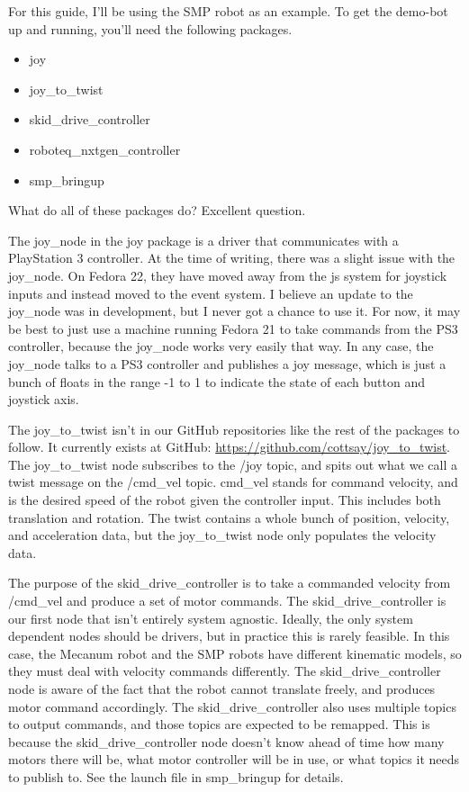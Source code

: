  For this guide, I'll be using the SMP robot as an example. To get the demo-bot up and running, you'll need the following packages.

\begin{itemize}
\item{joy}
\item{joy\_to\_twist}
\item{skid\_drive\_controller}
\item{roboteq\_nxtgen\_controller}
\item{smp\_bringup}
\end{itemize}

What do all of these packages do? Excellent question.

The joy\_node in the joy package is a driver that communicates with a PlayStation 3 controller. At the time of writing, there was a slight issue with the joy\_node. On Fedora 22, they have moved away from the js system for joystick inputs and instead moved to the event system. I believe an update to the joy\_node was in development, but I never got a chance to use it. For now, it may be best to just use a machine running Fedora 21 to take commands from the PS3 controller, because the joy\_node works very easily that way. In any case, the joy\_node talks to a PS3 controller and publishes a joy message, which is just a bunch of floats in the range -1 to 1 to indicate the state of each button and joystick axis.

The joy\_to\_twist isn't in our GitHub repositories like the rest of the packages to follow. It currently exists at GitHub: \url{https://github.com/cottsay/joy_to_twist}. The joy\_to\_twist node subscribes to the /joy topic, and spits out what we call a twist message on the /cmd\_vel topic. cmd\_vel stands for command velocity, and is the desired speed of the robot given the controller input. This includes both translation and rotation. The twist contains a whole bunch of position, velocity, and acceleration data, but the joy\_to\_twist node only populates the velocity data.

The purpose of the skid\_drive\_controller is to take a commanded velocity from /cmd\_vel and produce a set of motor commands. The skid\_drive\_controller is our first node that isn't entirely system agnostic. Ideally, the only system dependent nodes should be drivers, but in practice this is rarely feasible. In this case, the Mecanum robot and the SMP robots have different kinematic models, so they must deal with velocity commands differently. The skid\_drive\_controller node is aware of the fact that the robot cannot translate freely, and produces motor command accordingly. The skid\_drive\_controller also uses multiple topics to output commands, and those topics are expected to be remapped. This is because the skid\_drive\_controller node doesn't know ahead of time how many motors there will be, what motor controller will be in use, or what topics it needs to publish to. See the launch file in smp\_bringup for details.

